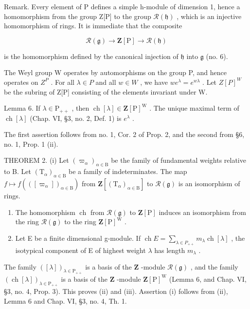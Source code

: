 Remark. Every element of P defines a simple h-module of dimension 1, hence a homomorphism from the group Z{[}P{]} to the group \(\mathcal{R}(\mathfrak{h})\) , which is an injective homomorphism of rings. It is immediate that the composite

\[
\mathcal {R} (\mathfrak {g}) \longrightarrow \mathbf {Z} [ \mathrm{P} ] \longrightarrow \mathcal {R} (\mathfrak {h})
\]

is the homomorphism defined by the canonical injection of \(\mathfrak{h}\) into \(\mathfrak{g}\) (no. 6).

The Weyl group W operates by automorphisms on the group P, and hence operates on \(Z^{P}\) . For all \(\lambda \in P\) and all \(w \in W\) , we have \(we^{\lambda} = e^{w\lambda}\) . Let \(Z[P]^{W}\) be the subring of Z{[}P{]} consisting of the elements invariant under W.

Lemma 6. If \(\lambda \in \mathrm{P}_{++}\) , then \(\operatorname{ch}[\lambda] \in \mathbf{Z}[\mathrm{P}]^{\mathrm{W}}\) . The unique maximal term of \(\operatorname{ch}[\lambda]\) (Chap. VI, §3, no. 2, Def. 1) is \(e^{\lambda}\) .

The first assertion follows from no. 1, Cor. 2 of Prop. 2, and the second from §6, no. 1, Prop. 1 (ii).

THEOREM 2. (i) Let \((\varpi_{\alpha})_{\alpha \in \mathrm{B}}\) be the family of fundamental weights relative to B. Let \((\mathrm{T}_{\alpha})_{\alpha \in \mathrm{B}}\) be a family of indeterminates. The map \(f\mapsto f(\left([ \varpi_{\alpha} ]\right)_{\alpha \in \mathrm{B}})\) from \(\mathbf{Z}[(\mathrm{T}_{\alpha})_{\alpha \in \mathrm{B}}]\) to \(\mathcal{R}(\mathfrak{g})\) is an isomorphism of rings.

\begin{enumerate}
\def\labelenumi{(\roman{enumi})}
\setcounter{enumi}{1}
\item
  The homomorphism \(\operatorname{ch}\) from \(\mathcal{R}(\mathfrak{g})\) to \(\mathbf{Z}[\mathrm{P}]\) induces an isomorphism from the ring \(\mathcal{R}(\mathfrak{g})\) to the ring \(\mathbf{Z}[\mathrm{P}]^{\mathrm{W}}\) .
\item
  Let E be a finite dimensional g-module. If \(\operatorname{ch} E = \sum_{\lambda \in P_{++}} m_{\lambda} \operatorname{ch}[\lambda]\) , the isotypical component of E of highest weight \(\lambda\) has length \(m_{\lambda}\) .
\end{enumerate}

The family \(([\lambda])_{\lambda \in \mathrm{P}_{++}}\) is a basis of the \(\mathbf{Z}\) -module \(\mathcal{R}(\mathfrak{g})\) , and the family \((\operatorname{ch}[\lambda])_{\lambda \in \mathrm{P}_{++}}\) is a basis of the \(\mathbf{Z}\) -module \(\mathbf{Z}[\mathrm{P}]^{\mathrm{W}}\) (Lemma 6, and Chap. VI, §3, no. 4, Prop. 3). This proves (ii) and (iii). Assertion (i) follows from (ii), Lemma 6 and Chap. VI, §3, no. 4, Th. 1.

